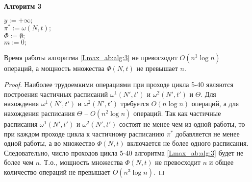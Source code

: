 \begin{algorithm}[h!]
\NoCaptionOfAlgo
\caption{\textbf{Алгоритм 3}\label{Lmax_ab:alg:3}}
\small
\SetAlgoLined
{}
$y:=+\infty;$\\
$\pi^*:= \omega(N,t);$\\
$\Phi:=\emptyset;$\\
$m:=0;$\\
\end{algorithm}
\normalsize
\begin{lemma}\label{Lmax_ab:lm:5}
Время работы алгоритма \ref{Lmax_ab:alg:3} не превосходит $O(n^3 \log n)$ операций, а мощность множества $\Phi(N,t)$ не превышает $n$.
\end{lemma}
\begin{proof}
Наиболее трудоемкими операциями при проходе цикла 5-40 являются построения частичных расписаний $\omega^1(N', t')$ и $\omega^2(N', t')$ и $\Theta$. Для нахождения $\omega^1(N', t')$ и $\omega^2(N', t')$ требуется $O(n \log n)$ операций, а для нахождения расписания $\Theta$ -- $O(n^2 \log n)$ операций. Так как частичные расписания $\omega^1(N', t')$ и $\omega^2(N', t')$ состоят не менее чем из одной работы, то при каждом проходе цикла к частичному расписанию $\pi^*$ добавляется не менее одной работы, а во множество $\Phi(N,t)$ включается не более одного расписания. Следовательно, число проходов цикла 5-40 алгоритма \ref{Lmax_ab:alg:3} будет не более чем $n$. Т.о., мощность множества $\Phi(N,t)$ не превосходит $n$ и общее количество операций не превышает $O(n^3 \log n)$.
\end{proof}
